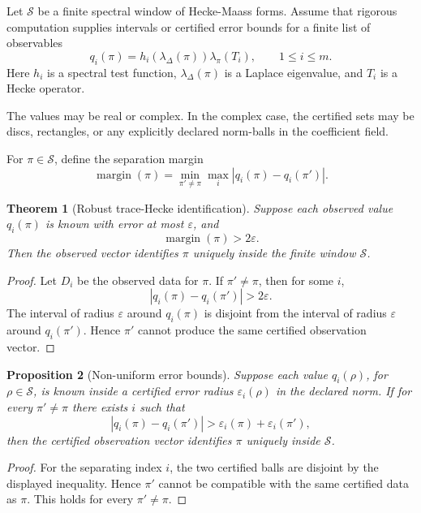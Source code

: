 \documentclass[11pt]{article}
\newtheorem{theorem}{Theorem}[section]
\newtheorem{proposition}[theorem]{Proposition}
\begin{document}
Let \(\mathcal S\) be a finite spectral window of Hecke-Maass forms.  Assume that rigorous computation supplies intervals or certified error bounds for a finite list of observables
\[
q_i(\pi)=h_i(\lambda_\Delta(\pi))\lambda_\pi(T_i),
\qquad
1\leq i\leq m.
\]
Here \(h_i\) is a spectral test function, \(\lambda_\Delta(\pi)\) is a Laplace eigenvalue, and \(T_i\) is a Hecke operator.

The values may be real or complex.  In the complex case, the certified sets may be discs, rectangles, or any explicitly declared norm-balls in the coefficient field.

For \(\pi\in\mathcal S\), define the separation margin
\[
\operatorname{margin}(\pi)=
\min_{\pi'\neq \pi}
\max_i |q_i(\pi)-q_i(\pi')|.
\]

\begin{theorem}[Robust trace-Hecke identification]
Suppose each observed value \(q_i(\pi)\) is known with error at most \(\varepsilon\), and
\[
\operatorname{margin}(\pi)>2\varepsilon.
\]
Then the observed vector identifies \(\pi\) uniquely inside the finite window \(\mathcal S\).
\end{theorem}

\begin{proof}
Let \(D_i\) be the observed data for \(\pi\).  If \(\pi'\neq\pi\), then for some \(i\),
\[
|q_i(\pi)-q_i(\pi')|>2\varepsilon.
\]
The interval of radius \(\varepsilon\) around \(q_i(\pi)\) is disjoint from the interval of radius \(\varepsilon\) around \(q_i(\pi')\).  Hence \(\pi'\) cannot produce the same certified observation vector.
\end{proof}

\begin{proposition}[Non-uniform error bounds]
Suppose each value \(q_i(\rho)\), for \(\rho\in\mathcal S\), is known inside a certified error radius \(\varepsilon_i(\rho)\) in the declared norm.  If for every \(\pi'\neq\pi\) there exists \(i\) such that
\[
|q_i(\pi)-q_i(\pi')|
>
\varepsilon_i(\pi)+\varepsilon_i(\pi'),
\]
then the certified observation vector identifies \(\pi\) uniquely inside \(\mathcal S\).
\end{proposition}

\begin{proof}
For the separating index \(i\), the two certified balls are disjoint by the displayed inequality.  Hence \(\pi'\) cannot be compatible with the same certified data as \(\pi\).  This holds for every \(\pi'\neq\pi\).
\end{proof}
\end{document}
